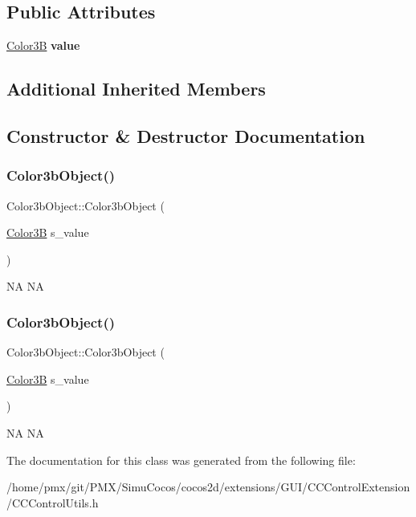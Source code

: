 \subsection*{Public Attributes}
\begin{DoxyCompactItemize}
\item 
\mbox{\label{classColor3bObject_af411b5028c19d8554a0a7ee039dbbe84}} 
\hyperlink{structColor3B}{Color3B} {\bfseries value}
\end{DoxyCompactItemize}
\subsection*{Additional Inherited Members}


\subsection{Constructor \& Destructor Documentation}
\mbox{\label{classColor3bObject_ac73a9196d675b8a4173142ee22d5208d}} 
\subsubsection{\texorpdfstring{Color3b\+Object()}{Color3bObject()}\hspace{0.1cm}{\footnotesize\ttfamily [1/2]}}
{\footnotesize\ttfamily Color3b\+Object\+::\+Color3b\+Object (\begin{DoxyParamCaption}\item[{\hyperlink{structColor3B}{Color3B}}]{s\+\_\+value }\end{DoxyParamCaption})\hspace{0.3cm}{\ttfamily [inline]}}

NA  NA \mbox{\label{classColor3bObject_ac73a9196d675b8a4173142ee22d5208d}} 
\subsubsection{\texorpdfstring{Color3b\+Object()}{Color3bObject()}\hspace{0.1cm}{\footnotesize\ttfamily [2/2]}}
{\footnotesize\ttfamily Color3b\+Object\+::\+Color3b\+Object (\begin{DoxyParamCaption}\item[{\hyperlink{structColor3B}{Color3B}}]{s\+\_\+value }\end{DoxyParamCaption})\hspace{0.3cm}{\ttfamily [inline]}}

NA  NA 

The documentation for this class was generated from the following file\+:\begin{DoxyCompactItemize}
\item 
/home/pmx/git/\+P\+M\+X/\+Simu\+Cocos/cocos2d/extensions/\+G\+U\+I/\+C\+C\+Control\+Extension/C\+C\+Control\+Utils.\+h\end{DoxyCompactItemize}
